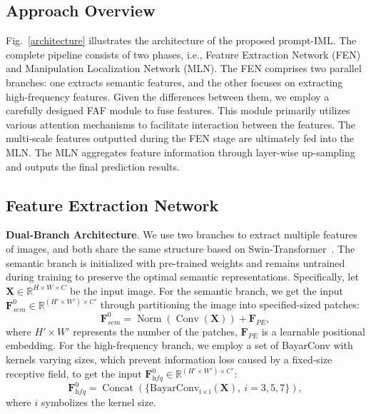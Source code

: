 \documentclass{article}
\begin{document}
\subsection{Approach Overview}
Fig.~\ref{architecture} illustrates the architecture of the proposed prompt-IML. The complete pipeline consists of two phases, i.e., Feature Extraction Network (FEN) and Manipulation Localization Network (MLN).
The FEN comprises two parallel branches: one extracts semantic features, and the other focuses on extracting high-frequency features. Given the differences between them, we employ a carefully designed FAF module to fuse features. This module primarily utilizes various attention mechanisms to facilitate interaction between the features. The multi-scale features outputted during the FEN stage are ultimately fed into the MLN. The MLN aggregates feature information through layer-wise up-sampling and outputs the final prediction results.

\subsection{Feature Extraction Network}
\textbf{Dual-Branch Architecture}. We use two branches to extract multiple features of images, and both share the same structure based on Swin-Transformer~\cite{swin}. The semantic branch is initialized with pre-trained weights and remains untrained during training to preserve the optimal semantic representations. Specifically, let $\mathbf{X}\in \mathbb{R}^{H\times W\times C}$ be the input image. For the semantic branch, we get the input $\mathbf F^0_{sem}\in \mathbb{R}^{(H'\times W')\times C'}$ through partitioning the image into specified-sized patches:
\begin{equation}
    \mathbf F^0_{sem} = \operatorname{Norm}(\operatorname{Conv}(\mathbf X)) + \mathbf F_{PE}, 
\end{equation}
where $H'\times W'$ represents the number of the patches, $\mathbf F_{PE}$ is a learnable positional embedding. For the high-frequency branch, we employ a set of BayarConv with kernels varying sizes, which prevent information loss caused by a fixed-size receptive field, to get the input $\mathbf F^0_{\textit{hfq}}\in \mathbb{R}^{(H'\times W')\times C'}$:
\begin{equation}
\mathbf F^0_{\textit{hfq}} = \operatorname{Concat}(\{\operatorname{BayarConv_{i\times i}(\mathbf X)},\ i=3,5,7\}), 
\end{equation}
where $i$ symbolizes the kernel size.
\end{document}

